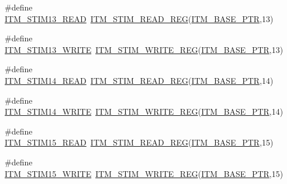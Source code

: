 \begin{DoxyCompactItemize}
\item 
\#define \hyperlink{group___i_t_m___register___accessor___macros_ga926c47eb7733a253885c7246858defa7}{I\+T\+M\+\_\+\+S\+T\+I\+M13\+\_\+\+R\+E\+AD}~\hyperlink{group___i_t_m___register___accessor___macros_ga5009882336aadcd4f37b45cf3395c450}{I\+T\+M\+\_\+\+S\+T\+I\+M\+\_\+\+R\+E\+A\+D\+\_\+\+R\+EG}(\hyperlink{group___i_t_m___peripheral_gafaddee8fe8b6a898d4e5edc43ee0d703}{I\+T\+M\+\_\+\+B\+A\+S\+E\+\_\+\+P\+TR},13)
\item 
\#define \hyperlink{group___i_t_m___register___accessor___macros_gab8eddf17288ccf56195272767250b472}{I\+T\+M\+\_\+\+S\+T\+I\+M13\+\_\+\+W\+R\+I\+TE}~\hyperlink{group___i_t_m___register___accessor___macros_ga049ca92a4e78e77c19af81e51aa73f1c}{I\+T\+M\+\_\+\+S\+T\+I\+M\+\_\+\+W\+R\+I\+T\+E\+\_\+\+R\+EG}(\hyperlink{group___i_t_m___peripheral_gafaddee8fe8b6a898d4e5edc43ee0d703}{I\+T\+M\+\_\+\+B\+A\+S\+E\+\_\+\+P\+TR},13)
\item 
\#define \hyperlink{group___i_t_m___register___accessor___macros_ga17048d30e461864d3d4ff5449fb8558f}{I\+T\+M\+\_\+\+S\+T\+I\+M14\+\_\+\+R\+E\+AD}~\hyperlink{group___i_t_m___register___accessor___macros_ga5009882336aadcd4f37b45cf3395c450}{I\+T\+M\+\_\+\+S\+T\+I\+M\+\_\+\+R\+E\+A\+D\+\_\+\+R\+EG}(\hyperlink{group___i_t_m___peripheral_gafaddee8fe8b6a898d4e5edc43ee0d703}{I\+T\+M\+\_\+\+B\+A\+S\+E\+\_\+\+P\+TR},14)
\item 
\#define \hyperlink{group___i_t_m___register___accessor___macros_ga74c1c1c1d5900b5c8553a289ddbab95b}{I\+T\+M\+\_\+\+S\+T\+I\+M14\+\_\+\+W\+R\+I\+TE}~\hyperlink{group___i_t_m___register___accessor___macros_ga049ca92a4e78e77c19af81e51aa73f1c}{I\+T\+M\+\_\+\+S\+T\+I\+M\+\_\+\+W\+R\+I\+T\+E\+\_\+\+R\+EG}(\hyperlink{group___i_t_m___peripheral_gafaddee8fe8b6a898d4e5edc43ee0d703}{I\+T\+M\+\_\+\+B\+A\+S\+E\+\_\+\+P\+TR},14)
\item 
\#define \hyperlink{group___i_t_m___register___accessor___macros_ga3ea562a68b32ba37c430e0b6d2507075}{I\+T\+M\+\_\+\+S\+T\+I\+M15\+\_\+\+R\+E\+AD}~\hyperlink{group___i_t_m___register___accessor___macros_ga5009882336aadcd4f37b45cf3395c450}{I\+T\+M\+\_\+\+S\+T\+I\+M\+\_\+\+R\+E\+A\+D\+\_\+\+R\+EG}(\hyperlink{group___i_t_m___peripheral_gafaddee8fe8b6a898d4e5edc43ee0d703}{I\+T\+M\+\_\+\+B\+A\+S\+E\+\_\+\+P\+TR},15)
\item 
\#define \hyperlink{group___i_t_m___register___accessor___macros_ga5363027769120ac7fd13164c60346eb1}{I\+T\+M\+\_\+\+S\+T\+I\+M15\+\_\+\+W\+R\+I\+TE}~\hyperlink{group___i_t_m___register___accessor___macros_ga049ca92a4e78e77c19af81e51aa73f1c}{I\+T\+M\+\_\+\+S\+T\+I\+M\+\_\+\+W\+R\+I\+T\+E\+\_\+\+R\+EG}(\hyperlink{group___i_t_m___peripheral_gafaddee8fe8b6a898d4e5edc43ee0d703}{I\+T\+M\+\_\+\+B\+A\+S\+E\+\_\+\+P\+TR},15)

\end{DoxyCompactItemize}
